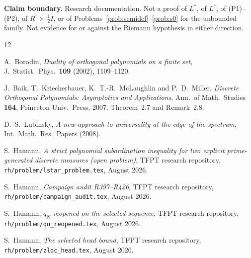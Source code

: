 \documentclass[11pt]{article}
\theoremstyle{remark}
\newcommand{\Rd}{R^{\dagger}}
\newcommand{\Ld}{L^{\dagger}}
\newcommand{\Ls}{L^{*}}
\newcommand{\half}{\tfrac12}
\begin{document}
\medskip\noindent
\textbf{Claim boundary.}\enspace
Research documentation.  Not a proof of $\Ls$, of $\Ld$, of
\textup{(P1)}--\textup{(P2)}, of $\Rd\succ\half I$, or of
Problems~\ref{prob:semidef}--\ref{prob:s0} for the
unbounded family.  Not evidence for or against the Riemann
hypothesis in either direction.

\begin{thebibliography}{12}

A.~Borodin,
\emph{Duality of orthogonal polynomials on a finite set},
J.~Statist.\ Phys.\ \textbf{109} (2002), 1109--1120.

J.~Baik, T.~Kriecherbauer, K.~T.-R.~McLaughlin and P.~D.~Miller,
\emph{Discrete Orthogonal Polynomials: Asymptotics and Applications},
Ann.\ of Math.\ Studies \textbf{164}, Princeton Univ.\ Press, 2007.
Theorem~2.7 and Remark~2.8.

D.~S.~Lubinsky,
\emph{A new approach to universality at the edge of the spectrum},
Int.\ Math.\ Res.\ Papers (2008).

S.~Hamann,
\emph{A strict polynomial subordination inequality for two explicit
prime-generated discrete measures (open problem)},
TFPT research repository, \texttt{rh/problem/lstar\_problem.tex},
August 2026.

S.~Hamann,
\emph{Campaign audit R397--R426},
TFPT research repository, \texttt{rh/problem/campaign\_audit.tex},
August 2026.

S.~Hamann,
\emph{$q_{N}$ reopened on the selected sequence},
TFPT research repository, \texttt{rh/problem/qn\_reopened.tex},
August 2026.

S.~Hamann,
\emph{The selected head bound},
TFPT research repository, \texttt{rh/problem/zloc\_head.tex},
August 2026.

\end{thebibliography}
\end{document}
